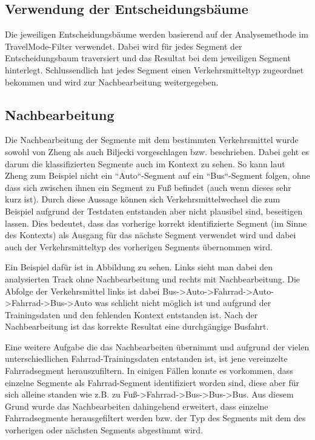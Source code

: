 \subsection{Verwendung der Entscheidungsbäume}
\label{entscheidungsbaum_verwendung}
Die jeweiligen Entscheidungsbäume werden basierend auf der Analysemethode im TravelMode-Filter verwendet. Dabei wird für jedes Segment der Entscheidungsbaum traversiert und das Resultat bei dem jeweiligen Segment hinterlegt. Schlussendlich hat jedes Segment einen Verkehrsmitteltyp zugeordnet bekommen und wird zur Nachbearbeitung weitergegeben.

\subsection{Nachbearbeitung}
\label{nachbearbeitung}
Die Nachbearbeitung der Segmente mit dem bestimmten Verkehrsmittel wurde sowohl von Zheng \cite{zheng_understanding_2010} als auch Biljecki \cite{biljecki_transportation_2013} vorgeschlagen bzw. beschrieben. Dabei geht es darum die klassifizierten Segmente auch im Kontext zu sehen. So kann laut Zheng \cite{zheng_understanding_2010} zum Beispiel nicht ein ``Auto``-Segment auf ein ``Bus``-Segment folgen, ohne dass sich zwischen ihnen ein Segment zu Fuß befindet (auch wenn dieses sehr kurz ist). Durch diese Aussage können sich Verkehrsmittelwechsel die zum Beispiel aufgrund der Testdaten entstanden aber nicht plausibel sind, beseitigen lassen. Dies bedeutet, dass das vorherige korrekt identifizierte Segment (im Sinne des Kontexts) als Ausgang für das nächste Segment verwendet wird und dabei auch der Verkehrsmitteltyp des vorherigen Segments übernommen wird. 

Ein Beispiel dafür ist in Abbildung  zu sehen. Links sieht man dabei den analysierten Track ohne Nachbearbeitung und rechts mit Nachbearbeitung. Die Abfolge der Verkehrsmittel links ist dabei Bus->Auto->Fahrrad->Auto->Fahrrad->Bus->Auto was schlicht nicht möglich ist und aufgrund der Trainingsdaten und den fehlenden Kontext entstanden ist. Nach der Nachbearbeitung ist das korrekte Resultat eine durchgängige Busfahrt. 


Eine weitere Aufgabe die das Nachbearbeiten übernimmt und aufgrund der vielen unterschiedlichen Fahrrad-Trainingsdaten entstanden ist, ist jene vereinzelte Fahrradsegment herauszufiltern. In einigen Fällen konnte es vorkommen, dass einzelne Segmente als Fahrrad-Segment identifiziert worden sind, diese aber für sich alleine standen wie z.B. zu Fuß->Fahrrad->Bus->Bus->Bus. Aus diesem Grund wurde das Nachbearbeiten dahingehend erweitert, dass einzelne Fahrradsegmente herausgefiltert werden bzw. der Typ des Segments mit dem des vorherigen oder nächsten Segments abgestimmt wird.
\clearpage

